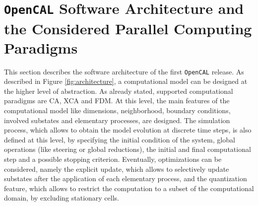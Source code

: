   
\section[Software Architecture]{\texttt{OpenCAL} Software Architecture and the Considered Parallel Computing Paradigms}
  This section describes the software architecture of the first
  \texttt{OpenCAL} release. As described in Figure \ref{fig:architecture}, a
  computational model can be designed at the higher level of
  abstraction. As already stated, supported computational paradigms
  are CA, XCA and FDM. At this level, the main features of the
  computational model like dimensions, neighborhood, boundary
  conditions, involved substates and elementary processes, are
  designed. The simulation process, which allows to obtain the model
  evolution at discrete time steps, is also defined at this level, by
  specifying the initial condition of the system, global operations
  (like steering or global reductions), the initial and final
  computational step and a possible stopping criterion. Eventually,
  optimizations can be considered, namely the explicit update, which
  allows to selectively update substates after the application of each
  elementary process, and the quantization feature, which allows to
  restrict the computation to a subset of the computational domain, by
  excluding stationary cells.
  
